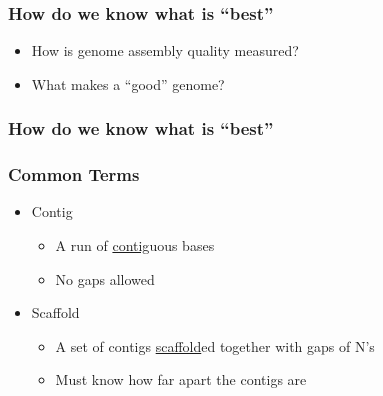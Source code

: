 \documentclass[14pt,handout]{beamer}
\begin{document}
\begin{frame}
\frametitle{How do we know what is ``best''}
\begin{itemize}
	\item<+-> How is genome assembly quality measured?
	\item<+-> What makes a ``good'' genome?
\end{itemize}
\end{frame}

\begin{frame}
\frametitle{How do we know what is ``best''}
\end{frame}


\begin{frame}
\frametitle{Common Terms}
\begin{itemize}
	\item<+-> Contig
	\begin{itemize}
		\item<+-> A run of \underline{contig}uous bases
		\item<+-> No gaps allowed
	\end{itemize}
	\item<+-> Scaffold
	\begin{itemize}
		\item<+-> A set of contigs \underline{scaffold}ed together with gaps of N's
		\item<+-> Must know how far apart the contigs are
	\end{itemize}
\end{itemize}
\end{frame}
\end{document}
